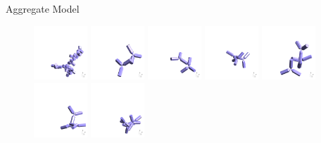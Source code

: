 \documentclass[12pt]{beamer}
\begin{document}
\begin{frame}{Aggregate Model}
\begin{figure}
    \includegraphics[width = 0.18\textwidth]{Figures/aggregates/aggregate2258.png}
    \includegraphics[width = 0.18\textwidth]{Figures/aggregates/aggregate2387.png}
    \includegraphics[width = 0.18\textwidth]{Figures/aggregates/aggregate2527.png}
    \hfill
    \includegraphics[width = 0.18\textwidth]{Figures/aggregates/aggregate2678.png}
    \includegraphics[width = 0.18\textwidth]{Figures/aggregates/aggregate2891.png}
    \includegraphics[width = 0.18\textwidth]{Figures/aggregates/aggregate3004.png}
    \includegraphics[width = 0.18\textwidth]{Figures/aggregates/aggregate3170.png}

\end{figure}
\end{frame}
\end{document}
